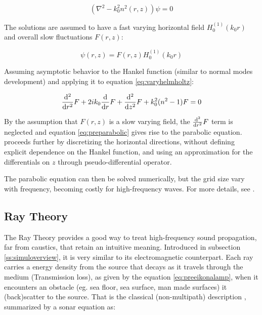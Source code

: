 \begin{equation}
\label{eq:varyhelmholtz}
(\nabla^2 - k_0^2n^2(r,z))\psi = 0 
\end{equation}

The solutions are assumed to have a fast varying horizontal field
$H_0^{(1)}(k_0r)$ and overall slow fluctuations $F(r,z)$:

\begin{equation*}
\psi(r,z) = F(r,z)H_0^{(1)}(k_0r)
\end{equation*}

Assuming asymptotic behavior to the Hankel function (similar to normal modes
development) and applying it to equation \ref{eq:varyhelmholtz}:

\begin{equation}
\label{eq:preparabolic}
\frac{\mathrm{d^{2}}}{\mathrm{d}{r}^{2}}F + 2ik_0\frac{\mathrm{d}}{\mathrm{d}r}F + \frac{\mathrm{d^{2}}}{\mathrm{d}{z}^{2}}F + k_0^2(n^2-1)F = 0
\end{equation}

By the assumption that $F(r,z)$ is a slow varying field, the $\frac{\mathrm{d^{2}}}{\mathrm{d}{r}^{2}}F$
term is neglected and equation \ref{eq:preparabolic} gives rise to the parabolic
equation. \citet{LURTON} proceeds further by discretizing the horizontal
directions, without defining explicit dependence on the Hankel function, and
using an approximation for the differentials on $z$ through pseudo-differential
operator.

The parabolic equation can then be solved numerically, but the grid size vary
with frequency, becoming costly for high-frequency waves. For more
details, see \citet{jensen2011computational}.

\subsection{Ray Theory}
\label{ss:raytheory}

The Ray Theory provides a good way to treat high-frequency sound propagation,
far from caustics, that retain an intuitive meaning. Introduced in subsection
\ref{ss:simuloverview}, it is very similar to its electromagnetic counterpart.
Each ray carries a energy density from the source that decays as it travels
through the medium (Transmission loss), as given by the equation
\ref{eq:preeikonalamp}, when it encounters an obstacle (eg. sea floor, sea
surface, man made surfaces) it (back)scatter to the source. That is the
classical (non-multipath) description
\cite{LURTON,Etter2013,miller2015real,bell1997application}, summarized by a
sonar equation as:

